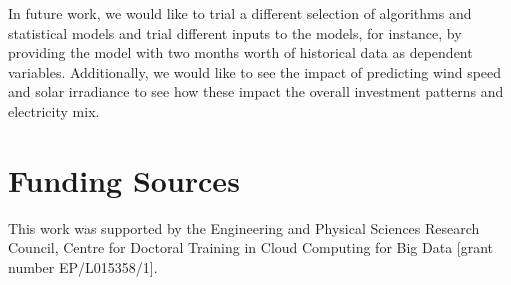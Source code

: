 \documentclass[final,3p,times,twocolumn,numbers]{elsarticle}
\begin{document}
In future work, we would like to trial a different selection of algorithms and statistical models and trial different inputs to the models, for instance, by providing the model with two months worth of historical data as dependent variables. Additionally, we would like to see the impact of predicting wind speed and solar irradiance to see how these impact the overall investment patterns and electricity mix. 


\section{Funding Sources}

This work was supported by the Engineering and Physical Sciences Research Council, Centre for Doctoral Training in Cloud Computing for Big Data [grant number EP/L015358/1].







   
  


%
%
%
\end{document}

